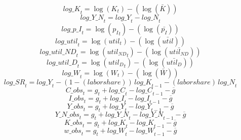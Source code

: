 \begin{dmath}
{log\_K}_{t}=\log\left({{K}}_{t}\right)-(\log\left(\bar{{K}}\right))
\end{dmath}
\begin{dmath}
{log\_Y\_N}_{t}={log\_Y}_{t}-{log\_N}_{t}
\end{dmath}
\begin{dmath}
{log\_p\_I}_{t}=\log\left({{p_I}}_{t}\right)-(\log\left(\bar{{p_I}}\right))
\end{dmath}
\begin{dmath}
{log\_util}_{t}=\log\left({{util}}_{t}\right)-(\log\left(\bar{{util}}\right))
\end{dmath}
\begin{dmath}
{log\_util\_ND}_{t}=\log\left({{util_{ND}}}_{t}\right)-(\log\left(\bar{{util_{ND}}}\right))
\end{dmath}
\begin{dmath}
{log\_util\_D}_{t}=\log\left({{util_D}}_{t}\right)-(\log\left(\bar{{util_D}}\right))
\end{dmath}
\begin{dmath}
{log\_W}_{t}=\log\left({{W}}_{t}\right)-(\log\left(\bar{{W}}\right))
\end{dmath}
\begin{dmath}
{log\_SR}_{t}={log\_Y}_{t}-\left(1-{(labor share)}\right)\, {log\_K}_{t-1}-{(labor share)}\, {log\_N}_{t}
\end{dmath}
\begin{dmath}
{C\_obs}_{t}={{g}}_{t}+{log\_C}_{t}-{log\_C}_{t-1}-{{\overline{g}}}
\end{dmath}
\begin{dmath}
{I\_obs}_{t}={{g}}_{t}+{log\_I}_{t}-{log\_I}_{t-1}-{{\overline{g}}}
\end{dmath}
\begin{dmath}
{Y\_obs}_{t}={{g}}_{t}+{log\_Y}_{t}-{log\_Y}_{t-1}-{{\overline{g}}}
\end{dmath}
\begin{dmath}
{Y\_N\_obs}_{t}={{g}}_{t}+{log\_Y\_N}_{t}-{log\_Y\_N}_{t-1}-{{\overline{g}}}
\end{dmath}
\begin{dmath}
{K\_obs}_{t}={{g}}_{t}+{log\_K}_{t}-{log\_K}_{t-1}-{{\overline{g}}}
\end{dmath}
\begin{dmath}
{w\_obs}_{t}={{g}}_{t}+{log\_W}_{t}-{log\_W}_{t-1}-{{\overline{g}}}
\end{dmath}

